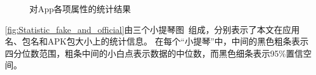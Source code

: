 \begin{figure}[htbp]
	\centering
    \hfill
    \hfill
    \hfill
	\caption{对App各项属性的统计结果}
	\label{fig:Statistic_fake_and_official}
	\vspace{-5mm}
\end{figure}

\autoref{fig:Statistic_fake_and_official}由三个小提琴图~\cite{violinplot}组成，分别表示了本文在应用名、包名和APK包大小上的统计信息。
在每个``小提琴''中，中间的黑色粗条表示四分位数范围，粗条中间的小白点表示数据的中位数，而黑色细条表示95\%置信空间。

